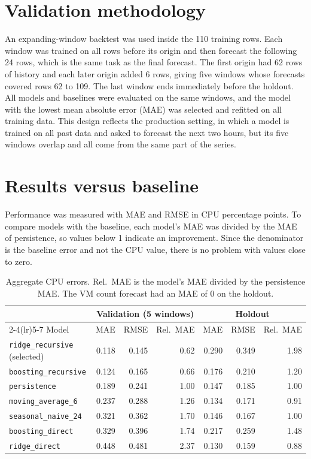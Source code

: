 \documentclass[11pt,a4paper]{article}
\newcommand{\m}[1]{\texttt{#1}}
\begin{document}
\section{Validation methodology}

An expanding-window backtest was used inside the 110 training rows. Each window was trained on all rows before its origin and then forecast the following 24 rows, which is the same task as the final forecast. The first origin had 62 rows of history and each later origin added 6 rows, giving five windows whose forecasts covered rows 62 to 109. The last window ends immediately before the holdout. All models and baselines were evaluated on the same windows, and the model with the lowest mean absolute error (MAE) was selected and refitted on all training data. This design reflects the production setting, in which a model is trained on all past data and asked to forecast the next two hours, but its five windows overlap and all come from the same part of the series.

\section{Results versus baseline}

Performance was measured with MAE and RMSE in CPU percentage points. To compare models with the baseline, each model's MAE was divided by the MAE of persistence, so values below 1 indicate an improvement. Since the denominator is the baseline error and not the CPU value, there is no problem with values close to zero.

\begin{table}[H]
  \centering
  \small
  \begin{tabular}{lrrrrrr}
    \toprule
    & \multicolumn{3}{c}{Validation (5 windows)} & \multicolumn{3}{c}{Holdout} \\
    \cmidrule(lr){2-4}\cmidrule(lr){5-7}
    Model & MAE & RMSE & Rel.\ MAE & MAE & RMSE & Rel.\ MAE \\
    \midrule
    \m{ridge\_recursive} (selected) & 0.118 & 0.145 & 0.62 & 0.290 & 0.349 & 1.98 \\
    \m{boosting\_recursive} & 0.124 & 0.165 & 0.66 & 0.176 & 0.210 & 1.20 \\
    \m{persistence} & 0.189 & 0.241 & 1.00 & 0.147 & 0.185 & 1.00 \\
    \m{moving\_average\_6} & 0.237 & 0.288 & 1.26 & 0.134 & 0.171 & 0.91 \\
    \m{seasonal\_naive\_24} & 0.321 & 0.362 & 1.70 & 0.146 & 0.167 & 1.00 \\
    \m{boosting\_direct} & 0.329 & 0.396 & 1.74 & 0.217 & 0.259 & 1.48 \\
    \m{ridge\_direct} & 0.448 & 0.481 & 2.37 & 0.130 & 0.159 & 0.88 \\
    \bottomrule
  \end{tabular}
  \caption{Aggregate CPU errors. Rel.\ MAE is the model's MAE divided by the persistence MAE. The VM count forecast had an MAE of 0 on the holdout.}
\end{table}
\end{document}
